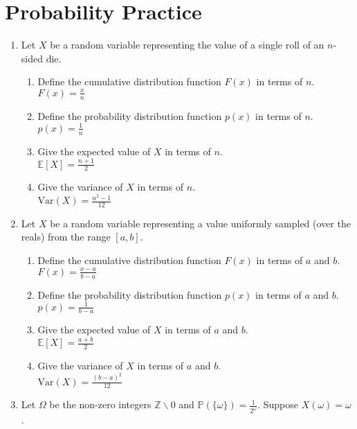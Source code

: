 \documentclass{article}
\newcommand{\PrMe}{\mathbb{P}}
\begin{document}
\section{Probability Practice}
\begin{enumerate}[label=\arabic*.]
\item Let $X$ be a random variable representing the value of a single roll of an $n$-sided die.
	\begin{enumerate}[label=(\alph*)]
	\item Define the cumulative distribution function $F(x)$ in terms of $n$. \\
		 {\color{blue} $F(x) = \frac{x}{n}$}
	\item Define the probability distribution function $p(x)$ in terms of $n$. \\
		 {\color{blue} $p(x) = \frac{1}{n}$}
	\item Give the expected value of $X$ in terms of $n$. \\
		 {\color{blue} $\mathbb{E}[X] = \frac{n + 1}{2}$}
	\item Give the variance of $X$ in terms of $n$. \\
		 {\color{blue} $\text{Var}(X) =\frac{n^2 -1}{12}$}
	\end{enumerate}
\item Let $X$ be a random variable representing a value uniformly sampled (over the reals) from the range $[a, b]$.
	\begin{enumerate}[label=(\alph*)]
	\item Define the cumulative distribution function $F(x)$ in terms of $a$ and $b$. \\
		 {\color{blue} $F(x) = \frac{x-a}{b-a}$}
	\item Define the probability distribution function $p(x)$ in terms of $a$ and $b$. \\
		 {\color{blue} $p(x) = \frac{1}{b-a}$}
	\item Give the expected value of $X$ in terms of $a$ and $b$. \\
		 {\color{blue} $\mathbb{E}[X] = \frac{a + b}{2}$}
	\item Give the variance of $X$ in terms of $a$ and $b$. \\
		 {\color{blue} $\text{Var}(X) = \frac{(b-a)^2}{12}$}
	\end{enumerate}
\item Let $\Omega$ be the non-zero integers $\mathbb{Z} \backslash 0$ and $\PrMe(\{\omega\}) = \frac{1}{2^\omega}$. Suppose $X(\omega) = \omega$.
	\begin{enumerate}[label=(\alph*)]

\end{enumerate}
\end{enumerate}
\end{document}
